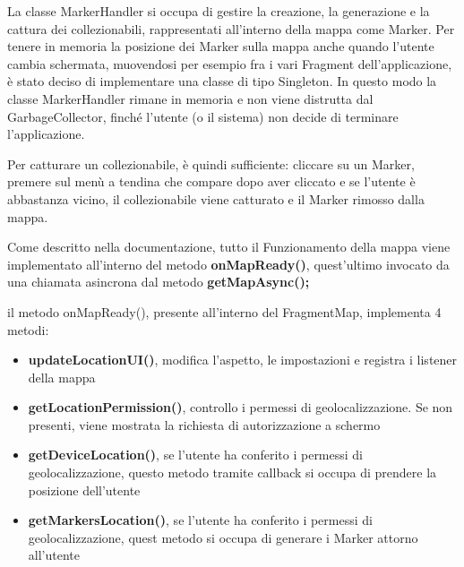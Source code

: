 \documentclass{article}
\begin{document}
\medskip

La classe MarkerHandler si occupa di gestire la creazione, la generazione e la cattura dei collezionabili, rappresentati
all'interno della mappa come Marker.
Per tenere in memoria la posizione dei Marker sulla mappa anche quando l'utente cambia schermata, muovendosi per esempio fra
i vari Fragment dell'applicazione, è stato deciso di implementare una classe di tipo Singleton. In questo modo la classe MarkerHandler
rimane in memoria e non viene distrutta dal GarbageCollector, finché l'utente (o il sistema) non decide di terminare l'applicazione.

\medskip

Per catturare un collezionabile, è quindi sufficiente: cliccare su un Marker, premere sul menù a tendina che compare dopo aver cliccato e 
se l'utente è abbastanza vicino, il collezionabile viene catturato e il Marker rimosso dalla mappa.  

Come descritto nella documentazione, tutto il Funzionamento della mappa viene implementato all'interno del metodo \textbf{onMapReady()}, 
quest'ultimo invocato da una chiamata asincrona dal metodo \textbf{getMapAsync();}

il metodo onMapReady(), presente all'interno del FragmentMap, implementa 4 metodi:
\begin{itemize}
    \itemsep 0em 
    \item \textbf{updateLocationUI()}, modifica l'aspetto, le impostazioni e registra i listener della mappa
    \item \textbf{getLocationPermission()}, controllo i permessi di geolocalizzazione. Se non presenti, viene mostrata la richiesta di autorizzazione a schermo
    \item \textbf{getDeviceLocation()}, se l'utente ha conferito i permessi di geolocalizzazione, questo metodo tramite callback si occupa di
    prendere la posizione dell'utente
    \item \textbf{getMarkersLocation()}, se l'utente ha conferito i permessi di geolocalizzazione, quest metodo si occupa di generare i Marker attorno all'utente
\end{itemize}
\end{document}
